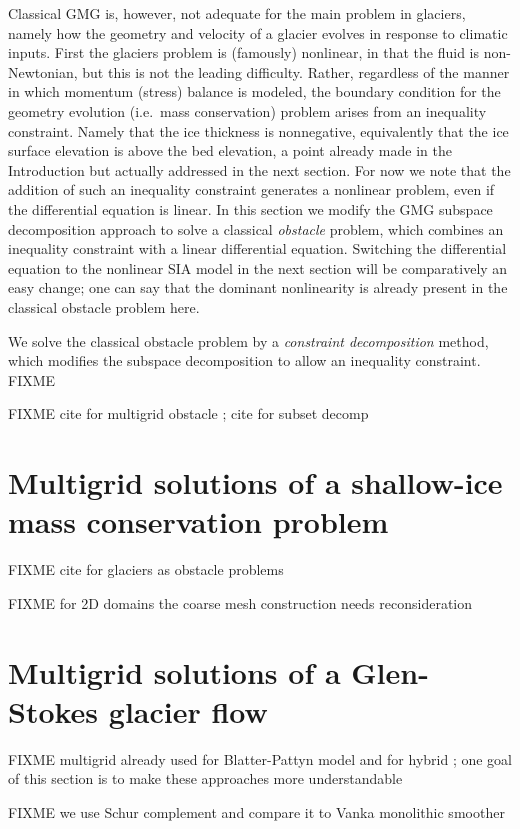 \documentclass[letterpaper,final,12pt,reqno]{amsart}
\begin{document}
Classical GMG is, however, not adequate for the main problem in glaciers, namely how the geometry and velocity of a glacier evolves in response to climatic inputs.  First the glaciers problem is (famously) nonlinear, in that the fluid is non-Newtonian, but this is not the leading difficulty.  Rather, regardless of the manner in which momentum (stress) balance is modeled, the boundary condition for the geometry evolution (i.e.~mass conservation) problem arises from an inequality constraint.  Namely that the ice thickness is nonnegative, equivalently that the ice surface elevation is above the bed elevation, a point already made in the Introduction but actually addressed in the next section.  For now we note that the addition of such an inequality constraint generates a nonlinear problem, even if the differential equation is linear.  In this section we modify the GMG subspace decomposition approach to solve a classical \emph{obstacle} problem, which combines an inequality constraint with a linear differential equation.  Switching the differential equation to the nonlinear SIA model in the next section will be comparatively an easy change; one can say that the dominant nonlinearity is already present in the classical obstacle problem here.

We solve the classical obstacle problem by a \emph{constraint decomposition} \cite{Tai2003} method, which modifies the subspace decomposition to allow an inequality constraint.  FIXME

FIXME cite for multigrid obstacle \cite{BrandtCryer1983,Bueler2021,GraeserKornhuber2009,Jouvetetal2013}; cite for subset decomp \cite{Tai2003}


\section{Multigrid solutions of a shallow-ice mass conservation problem} \label{sec:sia}

FIXME cite for glaciers as obstacle problems \cite{Bueler2016,Bueler2020,Calvoetal2002,JouvetBueler2012}

FIXME for 2D domains the coarse mesh construction needs reconsideration

\section{Multigrid solutions of a Glen-Stokes glacier flow} \label{sec:stokes}

FIXME multigrid already used for Blatter-Pattyn model \cite{BrownSmithAhmadia2013} and for hybrid \cite{Jouvetetal2013}; one goal of this section is to make these approaches more understandable

FIXME we use Schur complement \cite{Bueler2021,Elmanetal2014} and compare it to Vanka monolithic smoother \cite{Farrelletal2019}

\small

\bigskip


\end{document}
